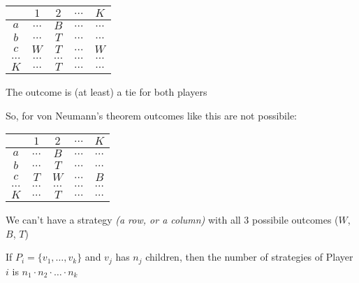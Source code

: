 \documentclass[../main.tex]{subfiles}
\begin{document}
\begin{center}
\begin{minipage}{0.3\textwidth}
        \centering
        \begin{tabular}{|c|c|c|c|c|}
            \hline
                     & $1$      & $2$      & $\ldots$ & $K$      \\\hline
            $a$      & $\ldots$ & $B$      & $\ldots$ & $\ldots$ \\\hline
            $b$      & $\ldots$ & $T$      & $\ldots$ & $\ldots$ \\\hline
            $c$      & $W$      & $T$      & $\ldots$ & $W$      \\\hline
            $\ldots$ & $\ldots$ & $\ldots$ & $\ldots$ & $\ldots$ \\\hline
            $K$      & $\ldots$ & $T$      & $\ldots$ & $\ldots$ \\
            \hline
        \end{tabular}
        \vspace{0.5cm}
        \par{The outcome is (at least) a tie for both players}
    \end{minipage}
\end{center}
\vspace{0.5cm}
So, for von Neumann's theorem outcomes like this are not possibile:
\vspace{0.5cm}
\begin{center}
    \begin{tabular}{|c|c|c|c|c|}
        \hline
                 & $1$      & $2$      & $\ldots$ & $K$      \\\hline
        $a$      & $\ldots$ & $B$      & $\ldots$ & $\ldots$ \\\hline
        $b$      & $\ldots$ & $T$      & $\ldots$ & $\ldots$ \\\hline
        $c$      & $T$      & $W$      & $\ldots$ & $B$      \\\hline
        $\ldots$ & $\ldots$ & $\ldots$ & $\ldots$ & $\ldots$ \\\hline
        $K$      & $\ldots$ & $T$      & $\ldots$ & $\ldots$ \\
        \hline
    \end{tabular}
\end{center}
\vspace{0.5cm}
We can't have a strategy \textit{(a row, or a column)} with all 3 possibile outcomes ($W$, $B$, $T$)

\begin{remark}
    If $P_i = \{v_1, \ldots , v_k \}$ and $v_j$ has $n_j$ children, then the number of strategies of Player $i$ is $n_1\cdot n_2\cdot \ldots\cdot n_k$
\end{remark}
\end{document}
